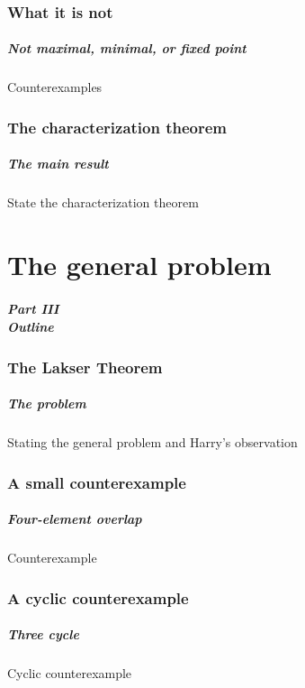 \documentclass{beamer}
\begin{document}
\section{What it is not}

\begin{frame}
\frametitle{Not maximal, minimal, or fixed point}

Counterexamples
\end{frame}

\section{The characterization theorem}

\begin{frame}
\frametitle{The main result}

State the characterization theorem
\end{frame}

\part{The general problem}

\begin{frame}
\partpage
\end{frame}

\begin{frame}
\frametitle{Part III\\Outline}

\tableofcontents
\end{frame}

\section{The Lakser Theorem}

\begin{frame}
\frametitle{The problem}

Stating the general problem and Harry's observation
\end{frame}

\section{A small counterexample}

\begin{frame}
\frametitle{Four-element overlap}

Counterexample
\end{frame}

\section{A cyclic counterexample}

\begin{frame}
\frametitle{Three cycle}

Cyclic counterexample
\end{frame}
\end{document}
